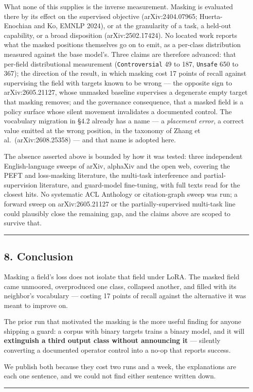 What none of this supplies is the inverse measurement. Masking is evaluated there by its effect on
the supervised objective (arXiv:2404.07965; Huerta-Enochian and Ko, EMNLP 2024), or at the
granularity of a task, a held-out capability, or a broad disposition (arXiv:2502.17424). No located
work reports what the masked positions themselves go on to emit, as a per-class distribution measured
against the base model's. Three claims are therefore advanced: that per-field
distributional measurement (\texttt{Controversial} 49 to 187, \texttt{Unsafe} 650 to 367); the direction of the
result, in which masking cost 17 points of recall against supervising the field with targets known to
be wrong --- the opposite sign to arXiv:2605.21127, whose unmasked baseline supervises a degenerate
empty target that masking removes; and the governance consequence, that a masked field is a policy
surface whose silent movement invalidates a documented control. The vocabulary migration in §4.2
already has a name --- a \emph{placement error}, a correct value emitted at the wrong position, in the
taxonomy of Zhang et al.~(arXiv:2608.25358) --- and that name is adopted here.

The absence asserted above is bounded by how it was tested: three independent English-language sweeps
of arXiv, alphaXiv and the open web, covering the PEFT and loss-masking literature, the multi-task
interference and partial-supervision literature, and guard-model fine-tuning, with full texts read
for the closest hits. No systematic ACL Anthology or citation-graph sweep was run; a forward sweep on
arXiv:2605.21127 or the partially-supervised multi-task line could plausibly close the remaining gap,
and the claims above are scoped to survive that.

\begin{center}\rule{0.5\linewidth}{0.5pt}\end{center}

\subsection{8. Conclusion}\label{conclusion}

Masking a field's loss does not isolate that field under LoRA. The masked field came unmoored,
overproduced one class, collapsed another, and filled with its neighbor's vocabulary --- costing 17
points of recall against the alternative it was meant to improve on.

The prior run that motivated the masking is the more useful finding for anyone shipping a guard: a
corpus with binary targets trains a binary model, and it will \textbf{extinguish a third output class
without announcing it} --- silently converting a documented operator control into a no-op that reports
success.

We publish both because they cost two runs and a week, the explanations are each one sentence, and we
could not find either sentence written down.

\begin{center}\rule{0.5\linewidth}{0.5pt}\end{center}
